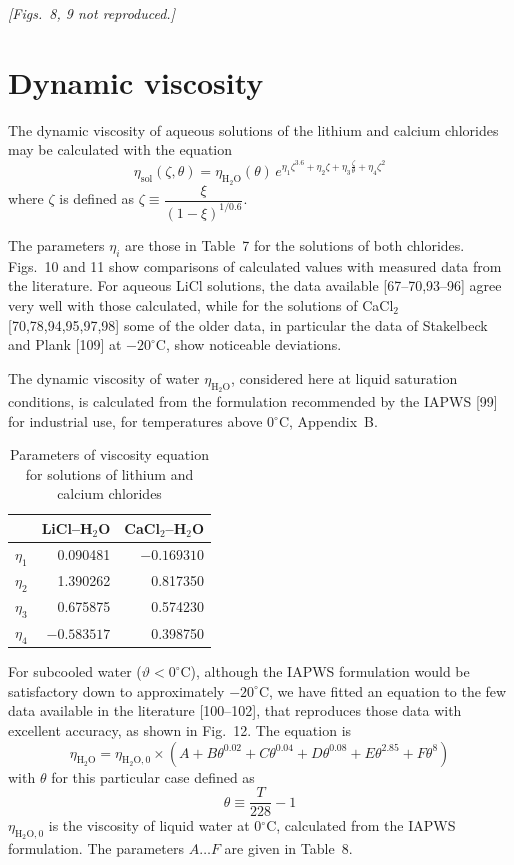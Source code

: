 \documentclass[11pt]{article}
\begin{document}
\textit{[Figs.~8, 9 not reproduced.]}

\section{Dynamic viscosity}

The dynamic viscosity of aqueous solutions of the lithium and calcium chlorides may be
calculated with the equation
\begin{equation}
\eta_{\mathrm{sol}}(\zeta,\theta) = \eta_{\mathrm{H_2O}}(\theta)\,
e^{\eta_1 \zeta^{3.6} + \eta_2 \zeta + \eta_3 \frac{\zeta}{\theta} + \eta_4 \zeta^2}
\end{equation}
where $\zeta$ is defined as $\zeta \equiv \dfrac{\xi}{(1-\xi)^{1/0.6}}$.

The parameters $\eta_i$ are those in Table~7 for the solutions of both chlorides.
Figs.~10 and 11 show comparisons of calculated values with measured data from the
literature. For aqueous LiCl solutions, the data available [67--70,93--96] agree very well
with those calculated, while for the solutions of CaCl$_2$ [70,78,94,95,97,98] some of the
older data, in particular the data of Stakelbeck and Plank [109] at $-20^{\circ}$C, show
noticeable deviations.

The dynamic viscosity of water $\eta_{\mathrm{H_2O}}$, considered here at liquid saturation
conditions, is calculated from the formulation recommended by the IAPWS [99] for industrial
use, for temperatures above 0$^{\circ}$C, Appendix~B.

\begin{table}[htbp]
\centering
\caption{Parameters of viscosity equation for solutions of lithium and calcium chlorides}
\begin{tabular}{lrr}
\toprule
 & LiCl--H$_2$O & CaCl$_2$--H$_2$O \\
\midrule
$\eta_1$ & 0.090481 & $-0.169310$ \\
$\eta_2$ & 1.390262 & 0.817350 \\
$\eta_3$ & 0.675875 & 0.574230 \\
$\eta_4$ & $-0.583517$ & 0.398750 \\
\bottomrule
\end{tabular}
\end{table}

For subcooled water ($\vartheta < 0^{\circ}$C), although the IAPWS formulation would be
satisfactory down to approximately $-20^{\circ}$C, we have fitted an equation to the few
data available in the literature [100--102], that reproduces those data with excellent
accuracy, as shown in Fig.~12. The equation is
\begin{equation}
\eta_{\mathrm{H_2O}} = \eta_{\mathrm{H_2O,0}} \times \left(A + B\theta^{0.02} +
C\theta^{0.04} + D\theta^{0.08} + E\theta^{2.85} + F\theta^{8}\right)
\end{equation}
with $\theta$ for this particular case defined as
\begin{equation}
\theta \equiv \frac{T}{228} - 1
\end{equation}
$\eta_{\mathrm{H_2O,0}}$ is the viscosity of liquid water at 0$^{\circ}$C, calculated from
the IAPWS formulation. The parameters $A \ldots F$ are given in Table~8.
\end{document}
